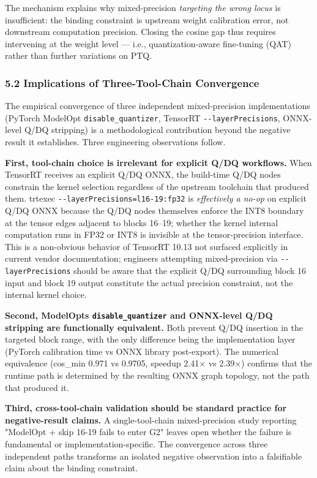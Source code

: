 \documentclass[
]{article}
\begin{document}
The mechanism explains why mixed-precision \emph{targeting the wrong
locus} is insufficient: the binding constraint is upstream weight
calibration error, not downstream computation precision. Closing the
cosine gap thus requires intervening at the weight level --- i.e.,
quantization-aware fine-tuning (QAT) rather than further variations on
PTQ.

\subsubsection{5.2 Implications of Three-Tool-Chain
Convergence}\label{52-implications-of-three-tool-chain-convergence}

The empirical convergence of three independent mixed-precision
implementations (PyTorch ModelOpt \texttt{disable\_quantizer}, TensorRT
\texttt{-\/-layerPrecisions}, ONNX-level Q/DQ stripping) is a
methodological contribution beyond the negative result it establishes.
Three engineering observations follow.

\textbf{First, tool-chain choice is irrelevant for explicit Q/DQ
workflows.} When TensorRT receives an explicit Q/DQ ONNX, the build-time
Q/DQ nodes constrain the kernel selection regardless of the upstream
toolchain that produced them. trtexec
\texttt{-\/-layerPrecisions=l16-19:fp32} is \emph{effectively a no-op}
on explicit Q/DQ ONNX because the Q/DQ nodes themselves enforce the INT8
boundary at the tensor edges adjacent to blocks 16--19; whether the
kernel internal computation runs in FP32 or INT8 is invisible at the
tensor-precision interface. This is a non-obvious behavior of TensorRT
10.13 not surfaced explicitly in current vendor documentation; engineers
attempting mixed-precision via \texttt{-\/-layerPrecisions} should be
aware that the explicit Q/DQ surrounding block 16 input and block 19
output constitute the actual precision constraint, not the internal
kernel choice.

\textbf{Second, ModelOpt\textquotesingle s \texttt{disable\_quantizer}
and ONNX-level Q/DQ stripping are functionally equivalent.} Both prevent
Q/DQ insertion in the targeted block range, with the only difference
being the implementation layer (PyTorch calibration time vs ONNX library
post-export). The numerical equivalence (cos\_min 0.971 vs 0.9705,
speedup 2.41× vs 2.39×) confirms that the runtime path is determined by
the resulting ONNX graph topology, not the path that produced it.

\textbf{Third, cross-tool-chain validation should be standard practice
for negative-result claims.} A single-tool-chain mixed-precision study
reporting "ModelOpt + skip 16-19 fails to enter G2" leaves open whether
the failure is fundamental or implementation-specific. The convergence
across three independent paths transforms an isolated negative
observation into a falsifiable claim about the binding constraint.
\end{document}
